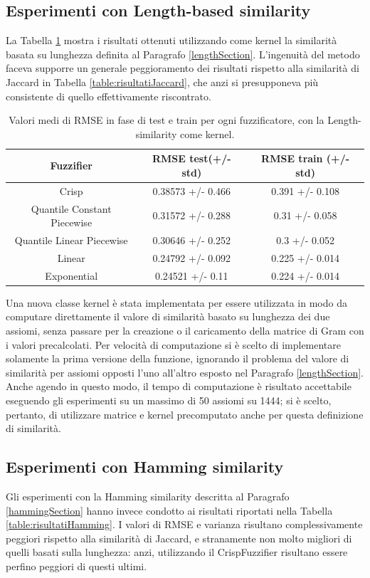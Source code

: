 \documentclass[12pt,a4paper]{report}
\begin{document}
\subsection{Esperimenti con Length-based similarity}
\label{esperimentiLength}
La Tabella \ref{table:risultatiLength} mostra i risultati ottenuti utilizzando come kernel la similarità basata su lunghezza definita al Paragrafo \ref{lengthSection}. L'ingenuità del metodo faceva supporre un generale peggioramento dei risultati rispetto alla similarità di Jaccard in Tabella \ref{table:risultatiJaccard}, che anzi si presupponeva più consistente di quello effettivamente riscontrato.

\begin{table}[h!]
\small
\centering 	
	\begin{tabular}{|c|c|c|} 
	 \hline
	 Fuzzifier & RMSE test(+/- std) & RMSE train (+/- std)\\ [0.5ex] 
	 \hline
	 Crisp & 0.38573 +/- 0.466 & 0.391 +/- 0.108 \\ 
	 \hline
	 Quantile Constant Piecewise & 0.31572 +/- 0.288 & 0.31 +/- 0.058\\
	 \hline
	 Quantile Linear Piecewise & 0.30646 +/- 0.252 & 0.3 +/- 0.052\\
	 \hline
	 Linear & 0.24792 +/- 0.092 & 0.225 +/- 0.014\\
	 \hline
	 Exponential & 0.24521 +/- 0.11 & 0.224 +/- 0.014\\ [1ex] 
	 \hline
	\end{tabular}
	\caption{Valori medi di RMSE in fase di test e train per ogni fuzzificatore, con la Length-similarity come kernel.}	
	\label{table:risultatiLength}
\end{table}

Una nuova classe kernel è stata implementata per essere utilizzata in modo da computare direttamente il valore di similarità basato su lunghezza dei due assiomi, senza passare per la creazione o il caricamento della matrice di Gram con i valori precalcolati.
Per velocità di computazione si è scelto di implementare solamente la prima versione della funzione, ignorando il problema del valore di similarità per assiomi opposti l'uno all'altro esposto nel Paragrafo \ref{lengthSection}.
Anche agendo in questo modo, il tempo di computazione è risultato accettabile eseguendo gli esperimenti su un massimo di 50 assiomi su 1444; si è scelto, pertanto, di utilizzare matrice e kernel precomputato anche per questa definizione di similarità. 

\subsection{Esperimenti con Hamming similarity}
\label{esperimentiHamming}
 Gli esperimenti con la Hamming similarity descritta al Paragrafo \ref{hammingSection} hanno invece condotto ai risultati riportati nella Tabella \ref{table:risultatiHamming}. I valori di RMSE e varianza risultano complessivamente peggiori rispetto alla similarità di Jaccard, e stranamente non molto migliori di quelli basati sulla lunghezza: anzi, utilizzando il CrispFuzzifier risultano essere perfino peggiori di questi ultimi.
\end{document}
